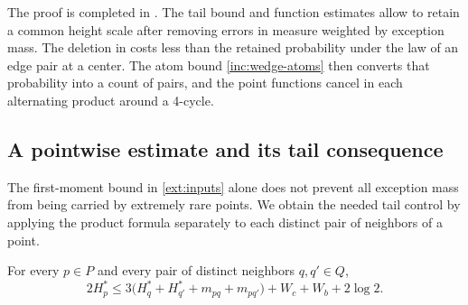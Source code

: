 The proof is completed in . The tail bound
 and function estimates  allow
 to retain a common height scale after removing errors
in measure weighted by exception mass. The deletion in  costs
less than the retained probability under the law of an edge pair at a center. The atom bound
\eqref{inc:wedge-atoms} then converts that probability into a count
of pairs, and the point functions cancel in each alternating product around a 4-cycle.

\subsection{A pointwise estimate and its tail consequence}

The first-moment bound in \eqref{ext:inputs} alone does not prevent all
exception mass from being carried by extremely rare points.  We obtain the
needed tail control by applying the product formula separately to each
distinct pair of neighbors of a point.

\begin{lemma}\label{ext:pointwise}
For every \(p\in P\) and every pair of distinct neighbors \(q,q'\in Q\),
\begin{equation}\label{ext:pointwise-bound}
 2H_p^*\le
 3\bigl(H_q^*+H_{q'}^*+m_{pq}+m_{pq'}\bigr)
       +W_c+W_b+2\log 2.
\end{equation}
\end{lemma}

